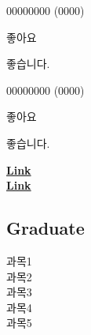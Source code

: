 \documentclass[a4paper]{MagicalCV}
\begin{document}
\lastupdated


\begin{minipage}[t]{0.33\textwidth} 


\vspace{\topsep} %
\begin{tightemize}
\item 00000000 (0000)
\item 좋아요
\item 좋습니다.
\end{tightemize}
\sectionsep

\vspace{\topsep} %
\begin{tightemize}
\item 00000000 (0000)
\item 좋아요
\item 좋습니다.
\end{tightemize}

\sectionsep


 \href{https://github.com/daily-kim}{\bf Link} \\
 \href{https://www.linkedin.com/}{\bf Link}
\sectionsep


\subsection{Graduate}
과목1 \\
과목2 \\
과목3 \\
과목4 \\
과목5
\sectionsep


\end{minipage}
\end{document}

